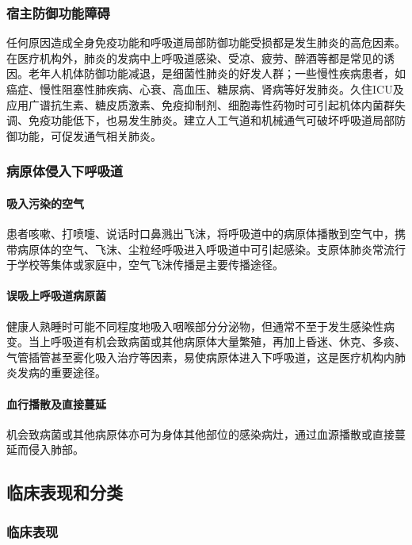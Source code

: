 \subsubsection{宿主防御功能障碍}

任何原因造成全身免疫功能和呼吸道局部防御功能受损都是发生肺炎的高危因素。在医疗机构外，肺炎的发病中上呼吸道感染、受凉、疲劳、醉酒等都是常见的诱因。老年人机体防御功能减退，是细菌性肺炎的好发人群；一些慢性疾病患者，如癌症、慢性阻塞性肺疾病、心衰、高血压、糖尿病、肾病等好发肺炎。久住ICU及应用广谱抗生素、糖皮质激素、免疫抑制剂、细胞毒性药物时可引起机体内菌群失调、免疫功能低下，也易发生肺炎。建立人工气道和机械通气可破坏呼吸道局部防御功能，可促发通气相关肺炎。

\subsubsection{病原体侵入下呼吸道}
\paragraph{吸入污染的空气}

患者咳嗽、打喷嚏、说话时口鼻溅出飞沫，将呼吸道中的病原体播散到空气中，携带病原体的空气、飞沫、尘粒经呼吸进入呼吸道中可引起感染。支原体肺炎常流行于学校等集体或家庭中，空气飞沫传播是主要传播途径。
\paragraph{误吸上呼吸道病原菌}

健康人熟睡时可能不同程度地吸入咽喉部分分泌物，但通常不至于发生感染性病变。当上呼吸道有机会致病菌或其他病原体大量繁殖，再加上昏迷、休克、多痰、气管插管甚至雾化吸入治疗等因素，易使病原体进入下呼吸道，这是医疗机构内肺炎发病的重要途径。
\paragraph{血行播散及直接蔓延}

机会致病菌或其他病原体亦可为身体其他部位的感染病灶，通过血源播散或直接蔓延而侵入肺部。

\subsection{临床表现和分类}

\subsubsection{临床表现}

